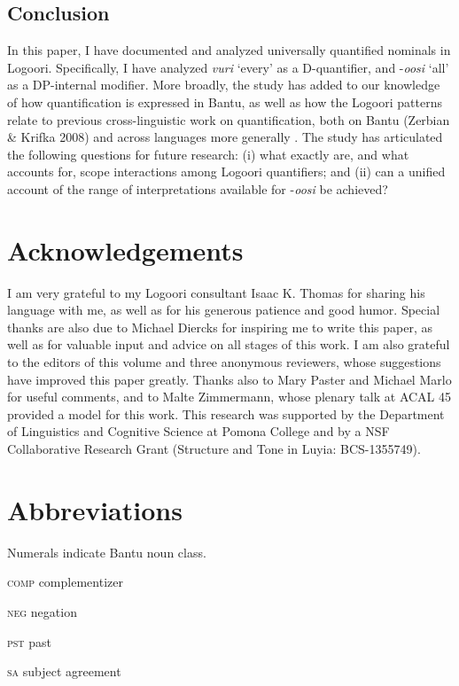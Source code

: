 \documentclass[output=paper]{langsci/langscibook}
\begin{document}
\section{ Conclusion}

In this paper, I have documented and analyzed universally quantified nominals in Logoori. Specifically, I have analyzed \textit{vuri} ‘every’ as a D-quantifier, and -\textit{oosi} ‘all’ as a DP-internal modifier. More broadly, the study has added to our knowledge of how quantification is expressed in Bantu, as well as how the Logoori patterns relate to previous cross-linguistic work on quantification, both on Bantu (Zerbian \& Krifka 2008) and across languages more generally \citep{Matthewson2013}. The study has articulated the following questions for future research: (i) what exactly are, and what accounts for, scope interactions among Logoori quantifiers; and (ii) can a unified account of the range of interpretations available for -\textit{oosi} be achieved?

\chapter{Acknowledgements}

I am very grateful to my Logoori consultant Isaac K. Thomas for sharing his language with me, as well as for his generous patience and good humor. Special thanks are also due to Michael Diercks for inspiring me to write this paper, as well as for valuable input and advice on all stages of this work. I am also grateful to the editors of this volume and three anonymous reviewers, whose suggestions have improved this paper greatly. Thanks also to Mary Paster and Michael Marlo for useful comments, and to Malte Zimmermann, whose plenary talk at ACAL 45 provided a model for this work. This research was supported by the Department of Linguistics and Cognitive Science at Pomona College and by a NSF Collaborative Research Grant (Structure and Tone in Luyia: BCS-1355749).

\chapter{Abbreviations}

Numerals indicate Bantu noun class.

\textsc{comp}  complementizer

\textsc{neg}  negation

\textsc{pst}  past

\textsc{sa}  subject agreement
\end{document}
